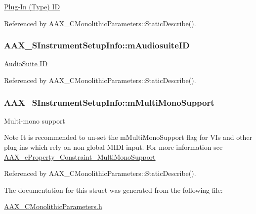 \hyperlink{a00283_a6571f4e41a5dd06e4067249228e2249ea89ca3dd6e96895cda14976c1b1ceb826}{Plug-\/\+In (Type) I\+D} 



Referenced by A\+A\+X\+\_\+\+C\+Monolithic\+Parameters\+::\+Static\+Describe().

\hypertarget{a00124_a9feeadf3348cf1b4ce13008d3a02aaef}{}
\subsubsection[{m\+Audiosuite\+I\+D}]{ A\+A\+X\+\_\+\+S\+Instrument\+Setup\+Info\+::m\+Audiosuite\+I\+D}\label{a00124_a9feeadf3348cf1b4ce13008d3a02aaef}


\hyperlink{a00283_a6571f4e41a5dd06e4067249228e2249ead3344696b8298a8b254add3d039ea927}{Audio\+Suite I\+D} 



Referenced by A\+A\+X\+\_\+\+C\+Monolithic\+Parameters\+::\+Static\+Describe().

\hypertarget{a00124_a0803c641f72241bea5d7cf984c6263ca}{}
\subsubsection[{m\+Multi\+Mono\+Support}]{ A\+A\+X\+\_\+\+S\+Instrument\+Setup\+Info\+::m\+Multi\+Mono\+Support}\label{a00124_a0803c641f72241bea5d7cf984c6263ca}
Multi-\/mono support

\begin{DoxyNote}{Note}
It is recommended to un-\/set the {\ttfamily m\+Multi\+Mono\+Support} flag for V\+Is and other plug-\/ins which rely on non-\/global M\+I\+D\+I input. For more information see \hyperlink{a00283_a6571f4e41a5dd06e4067249228e2249ea83f671685958bdc668ef574d5a2d92b0}{A\+A\+X\+\_\+e\+Property\+\_\+\+Constraint\+\_\+\+Multi\+Mono\+Support} 
\end{DoxyNote}


Referenced by A\+A\+X\+\_\+\+C\+Monolithic\+Parameters\+::\+Static\+Describe().



The documentation for this struct was generated from the following file\+:\begin{DoxyCompactItemize}
\item 
\hyperlink{a00178}{A\+A\+X\+\_\+\+C\+Monolithic\+Parameters.\+h}\end{DoxyCompactItemize}
